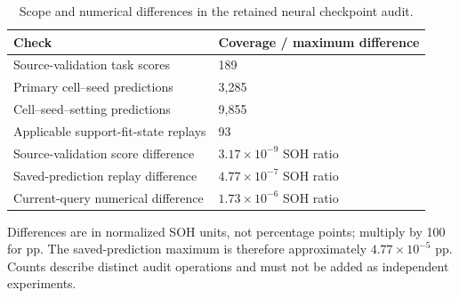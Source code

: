 \begin{table}[H]\centering
\caption{Scope and numerical differences in the retained neural checkpoint audit.}\label{tab:sneural}
\papertablesize\setlength{\tabcolsep}{4pt}\renewcommand{\arraystretch}{1.15}
\begin{tabular}{ll}\toprule
Check & Coverage / maximum difference \\ \midrule
Source-validation task scores & 189 \\
Primary cell--seed predictions & 3,285 \\
Cell--seed--setting predictions & 9,855 \\
Applicable support-fit-state replays & 93 \\
Source-validation score difference & $3.17\times10^{-9}$ SOH ratio \\
Saved-prediction replay difference & $4.77\times10^{-7}$ SOH ratio \\
Current-query numerical difference & $1.73\times10^{-6}$ SOH ratio \\
\bottomrule\end{tabular}
\par\smallskip\begin{minipage}{\linewidth}\papertablesize Differences are in normalized SOH units, not percentage points; multiply by 100 for pp. The saved-prediction maximum is therefore approximately $4.77\times10^{-5}$ pp. Counts describe distinct audit operations and must not be added as independent experiments.\end{minipage}
\end{table}
